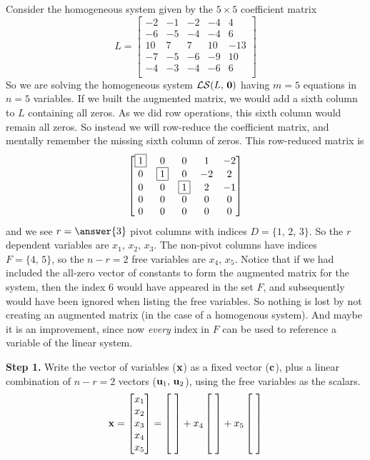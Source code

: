 \documentclass{ximera}
\begin{document}
\begin{example}
  Consider the homogeneous system given by the $5\times 5$ coefficient matrix
  \[
    L = \begin{bmatrix}
      -2 & -1 & -2 & -4 & 4 \\
      -6 & -5 &  -4 &  -4 & 6 \\
      10 & 7 & 7 &  10 & -13 \\
      -7 & -5 &  -6 & -9 & 10 \\
      -4 &  -3 & -4 & -6 & 6 \\
    \end{bmatrix}
  \]
  So we are solving the homogeneous system
  $\mathcal{LS}\!\left(L,\,\mathbf{0}\right)$ having $m=5$ equations in $n=5$
  variables.  If we built the augmented matrix, we would add a sixth
  column to $L$ containing all zeros.  As we did row operations, this
  sixth column would remain all zeros.  So instead we will row-reduce
  the coefficient matrix, and mentally remember the missing sixth
  column of zeros.  This row-reduced matrix is
  \[
    \begin{bmatrix}
      \fbox{1} & 0 & 0 & 1 & -2 \\
      0 & \fbox{1} & 0 &  -2 & 2 \\
      0 & 0 & \fbox{1} &  2 &  -1 \\
      0 & 0 & 0 & 0 &  0 \\
      0 & 0 & 0 & 0 &  0
    \end{bmatrix}
  \]
  and we see $r=\answer{3}$ pivot columns with indices
  $D=\{1,\,2,\,3\}$.  So the $r$ dependent variables are
  $x_1,\,x_2,\,x_3$.  The non-pivot columns have indices
  $F=\{4,\,5\}$, so the $n-r=2$ free variables are $x_4,\,x_5$. Notice
  that if we had included the all-zero vector of constants to form the
  augmented matrix for the system, then the index 6 would have
  appeared in the set $F$, and subsequently would have been ignored
  when listing the free variables.  So nothing is lost by not creating
  an augmented matrix (in the case of a homogenous system).  And maybe
  it is an improvement, since now \textit{every} index in $F$ can be
  used to reference a variable of the linear system.

  \textbf{Step 1.}  Write the vector of variables ($\mathbf{x}$) as a
  fixed vector ($\mathbf{c}$), plus a linear combination of $n-r=2$
  vectors ($\mathbf{u}_1,\,\mathbf{u}_2$), using the free variables as the
  scalars.
  \[
    \mathbf{x}=\begin{bmatrix}x_1\\x_2\\x_3\\x_4\\x_5\end{bmatrix}=
    \begin{bmatrix}\ \\\ \\\ \\\ \\\ \end{bmatrix}+
    x_4\begin{bmatrix}\ \\\ \\\ \\\ \\\ \end{bmatrix}+
    x_5\begin{bmatrix}\ \\\ \\\ \\\ \\\ \end{bmatrix}
  \]
  

\end{example}
\end{document}
